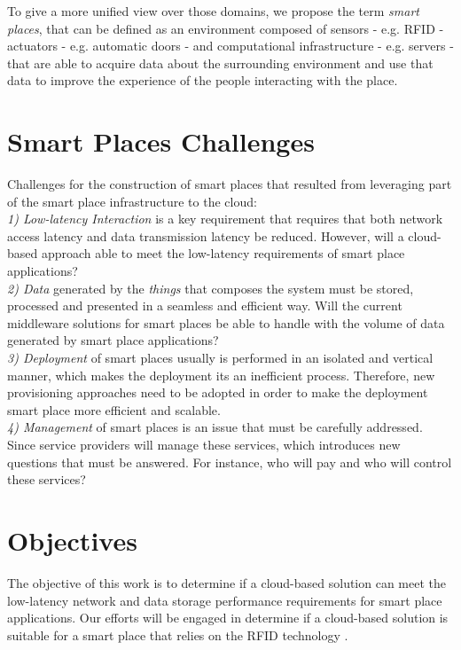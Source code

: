 To give a more unified view over those domains, we propose the term \textit{smart places},
that can be defined as an environment composed of sensors - e.g. RFID - actuators - e.g. automatic
doors - and computational infrastructure - e.g. servers - that are able to acquire data about the
surrounding environment and use that data to improve the experience of the people interacting with
the place.

\section{Smart Places Challenges}
\label{section:challenges}
Challenges \cite{caceres2012ubicomp} for the construction of smart places that resulted from leveraging
part of the smart place infrastructure to the cloud:\\

\textit{1) Low-latency Interaction} is a key requirement that requires that both network access
latency and data transmission latency be reduced. However, will a cloud-based
approach able to meet the low-latency requirements of smart place applications?\\

\textit{2) Data} generated by the \textit{things} that composes the system must be stored, processed
and presented in a seamless and efficient way. Will the current middleware solutions for smart places
\cite{floerkemeier2007rfid}\cite{eisenhauer2010hydra}\cite{de2008socrades} be able to handle with
the volume of data generated by smart place applications?\\

\textit{3) Deployment} of smart places usually is performed in an isolated and vertical manner, which
makes the deployment its an inefficient process. Therefore, new provisioning approaches need to be
adopted in order to make the deployment smart place more efficient and scalable.\\

\textit{4) Management} of smart places is an issue that must be carefully addressed. Since
service providers will manage these services, which introduces new questions that must be
answered. For instance, who will pay and who will control these services?

\section{Objectives}
\label{section:objectives}
The objective of this work is to determine if a cloud-based solution can meet the low-latency network
and data storage performance requirements for smart place applications. Our efforts will be engaged in
determine if a cloud-based solution is suitable for a smart place that relies on the RFID technology
\cite{want2006introduction}.

